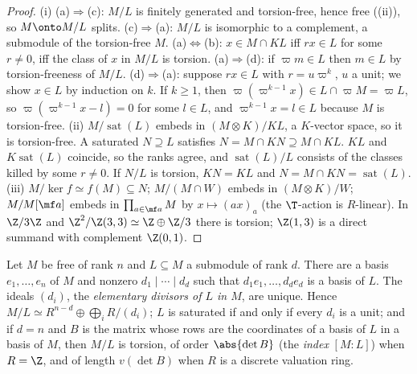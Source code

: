 \begin{proof}
(i) (a)$\Rightarrow$(c): $M/L$ is finitely generated and torsion-free, hence free ((ii)), so $M\onto M/L$ splits.
(c)$\Rightarrow$(a): $M/L$ is isomorphic to a complement, a submodule of the torsion-free $M$. (a)$\Leftrightarrow$(b): $x\in M\cap KL$ iff $rx\in L$ for
some $r\ne0$, iff the class of $x$ in $M/L$ is torsion. (a)$\Rightarrow$(d): if $\varpi m\in L$ then $m\in L$ by torsion-freeness of $M/L$.
(d)$\Rightarrow$(a): suppose $rx\in L$ with $r=u\varpi^k$, $u$ a unit; we show $x\in L$ by induction on $k$. If $k\ge1$, then
$\varpi(\varpi^{k-1}x)\in L\cap\varpi M=\varpi L$, so $\varpi(\varpi^{k-1}x-l)=0$ for some $l\in L$, and $\varpi^{k-1}x=l\in L$ because $M$ is torsion-free.
(ii) $M/\operatorname{sat}(L)$ embeds in $(M\otimes K)/KL$, a $K$-vector space, so it is torsion-free. A saturated $N\supseteq L$ satisfies $N=M\cap KN\supseteq M\cap KL$.
$KL$ and $K\operatorname{sat}(L)$ coincide, so the ranks agree, and $\operatorname{sat}(L)/L$ consists of the classes killed by some $r\ne0$. If $N/L$ is torsion, $KN=KL$
and $N=M\cap KN=\operatorname{sat}(L)$.
(iii) $M/\ker f\simeq f(M)\subseteq N$; $M/(M\cap W)$ embeds in $(M\otimes K)/W$; $M/M[\mf a]$ embeds in $\prod_{a\in\mf a}M$ by $x\mapsto(ax)_a$
(the $\T$-action is $R$-linear). In $\Z/3\Z$ and $\Z^2/\Z(3,3)\simeq\Z\oplus\Z/3$ there is torsion; $\Z(1,3)$ is a direct summand with
complement $\Z(0,1)$.
\end{proof}

\begin{theorem}\label{thm:modules:stacked-bases}
Let $M$ be free of rank $n$ and $L\subseteq M$ a submodule of rank $d$. There are a basis $e_1,\dots,e_n$ of $M$ and nonzero
$d_1\mid\cdots\mid d_d$ such that $d_1e_1,\dots,d_de_d$ is a basis of $L$. The ideals $(d_i)$, the \emph{elementary divisors of $L$ in $M$},
are unique. Hence $M/L\simeq R^{n-d}\oplus\bigoplus_iR/(d_i)$; $L$ is saturated if and only if every $d_i$ is a unit; and if $d=n$ and $B$ is
the matrix whose rows are the coordinates of a basis of $L$ in a basis of $M$, then $M/L$ is torsion, of order $\abs{\det B}$ (the
\emph{index} $[M:L]$) when $R=\Z$, and of length $v(\det B)$ when $R$ is a discrete valuation ring.
\end{theorem}

